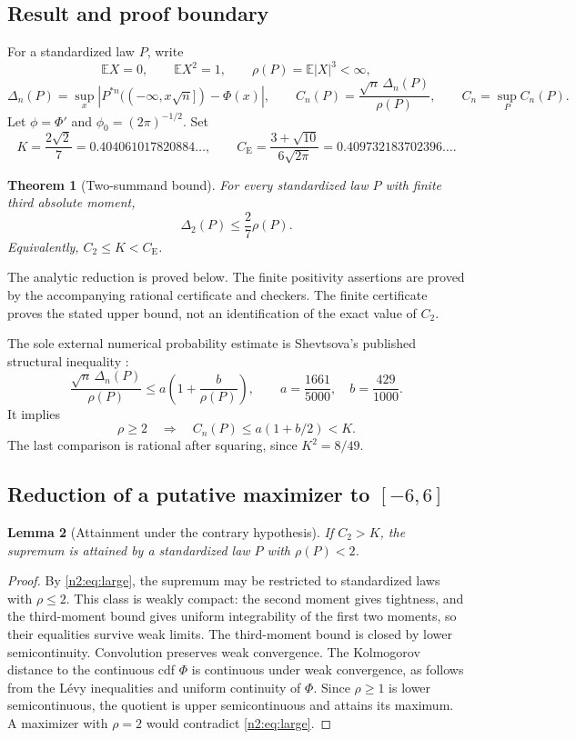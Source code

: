\documentclass[11pt,a4paper]{article}
\numberwithin{equation}{section}
\newtheorem{theorem}{Theorem}[section]
\newtheorem{lemma}[theorem]{Lemma}
\theoremstyle{definition}
\theoremstyle{remark}
\newcommand{\E}{\mathbb E}
\newcommand{\CE}{C_{\mathrm E}}
\begin{document}
\subsection{Result and proof boundary}
For a standardized law $P$, write
\[
 \E X=0,\qquad \E X^2=1,\qquad \rho(P)=\E|X|^3<\infty,
\]
\[
 \Delta_n(P)=\sup_x\left|P^{*n}(( -\infty,x\sqrt n])-\Phi(x)\right|,
 \qquad C_n(P)=\frac{\sqrt n\,\Delta_n(P)}{\rho(P)},\qquad C_n=\sup_P C_n(P).
\]
Let $\phi=\Phi'$ and $\phi_0=(2\pi)^{-1/2}$. Set
\[
 K=\frac{2\sqrt2}{7}=0.404061017820884\ldots,
 \qquad \CE=\frac{3+\sqrt{10}}{6\sqrt{2\pi}}=0.409732183702396\ldots.
\]
\begin{theorem}[Two-summand bound]\label{n2:thm:main}
For every standardized law $P$ with finite third absolute moment,
\[
 \boxed{\Delta_2(P)\le\frac27\rho(P).}
\]
Equivalently, $C_2\le K<\CE$.
\end{theorem}
The analytic reduction is proved below. The finite positivity assertions
are proved by the accompanying rational certificate and checkers. The finite certificate proves the stated upper bound, not an identification of the exact value of $C_2$.

The sole external numerical probability estimate is Shevtsova's published
structural inequality \cite{Shevtsova2013}:
\begin{equation}\label{n2:eq:struct}
 \frac{\sqrt n\,\Delta_n(P)}{\rho(P)}
 \le a\left(1+\frac b{\rho(P)}\right),
 \qquad a=\frac{1661}{5000},\quad b=\frac{429}{1000}.
\end{equation}
It implies
\begin{equation}\label{n2:eq:large}
 \rho\ge2\quad\Longrightarrow\quad
 C_n(P)\le a(1+b/2)<K.
\end{equation}
The last comparison is rational after squaring, since $K^2=8/49$.

\subsection{Reduction of a putative maximizer to \texorpdfstring{$[-6,6]$}{[-6,6]}}
\begin{lemma}[Attainment under the contrary hypothesis]\label{n2:lem:attain}
If $C_2>K$, the supremum is attained by a standardized law $P$ with $\rho(P)<2$.
\end{lemma}
\begin{proof}
By \eqref{n2:eq:large}, the supremum may be restricted to standardized laws with
$\rho\le2$. This class is weakly compact: the second moment gives tightness,
and the third-moment bound gives uniform integrability of the first two
moments, so their equalities survive weak limits. The third-moment bound is
closed by lower semicontinuity. Convolution preserves weak convergence.
The Kolmogorov distance to the continuous cdf $\Phi$ is continuous under weak
convergence, as follows from the L\'evy inequalities and uniform continuity
of $\Phi$. Since $\rho\ge1$ is lower semicontinuous, the quotient is upper
semicontinuous and attains its maximum. A maximizer with $\rho=2$ would
contradict \eqref{n2:eq:large}.
\end{proof}
\end{document}
